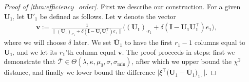 \documentclass[10pt]{article}
\newcommand{\0}{{\mathbf{0}}}
\newcommand{\1}{{\mathbf{1}}}
\newcommand{\U}{{\mathbf{U}}}
\renewcommand{\t}{^{\top}}
\begin{document}
\begin{proof}[Proof of \cref{thm:efficiency_order}]
First we describe our construction.  For a given $\mathbf{U}_1$, let $\mathbf{U'}_1$ be defined as follows. Let $\mathbf{v}$ denote the vector
\begin{align*}
    \mathbf{v} := \frac{1}{\| (\U_1)_{\cdot r_1} + \delta (\mathbf{I} - \U_1 \U_1\t ) e_1\| } \bigg( (\U_1)_{\cdot r_1} + \delta (\mathbf{I} - \U_{1} \U_{1}\t ) e_1 \bigg),
\end{align*}
where we will choose $\delta$ later. We set $\mathbf{\bar U}_1$ to have the first $r_1 - 1$ columns equal to $\U_1$, and we let its $r_1$'th column equal $\mathbf{v}$.  The proof proceeds in steps: first we demonstrate that $\mathcal{\bar T} \in \Theta(\lambda,\kappa,\mu_0,\sigma,\sigma_{\min})$, after which we upper bound the $\chi^2$ distance, and finally we lower bound the difference $\big|\xi\t\big( \U_1 - \mathbf{\bar U}_1\big)_{1\cdot} \big|$.


\end{proof}
\end{document}
